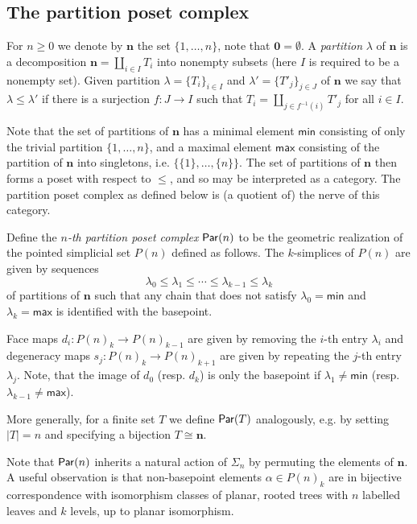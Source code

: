 \subsection{The partition poset complex}
For $n\geq 0$ we denote by $\mathbf{n}$ the set $\{1,\dots,n\}$, note that $\mathbf{0}=\emptyset$. A \textit{partition} $\lambda$ of $\mathbf{n}$ is a decomposition $\mathbf{n}=\coprod_{i\in I} T_i$ into nonempty subsets (here $I$ is required to be a nonempty set). Given partition $\lambda=\{T_i\}_{i\in I}$ and $\lambda'=\{T'_j\}_{j\in J}$ of $\mathbf{n}$ we say that $\lambda \leq \lambda'$ if there is a surjection $f\colon J\to I$ such that $T_i=\coprod_{j\in f^{-1}(i)} T'_j$ for all $i\in I$. 

Note that the set of partitions of $\mathbf{n}$ has a minimal element $\mathsf{min}$ consisting of only the trivial partition $\{1,\dots,n\}$, and a maximal element $\mathsf{max}$ consisting of the partition of $\mathbf{n}$ into singletons, i.e. $\{\{1\},\dots, \{n\}\}$. The set of partitions of $\mathbf{n}$ then forms a poset with respect to $\leq$, and so may be interpreted as a category. The partition poset complex as defined below is (a quotient of) the nerve of this category.

\begin{definition} \label{def:par-poset} Define the \textit{$n$-th partition poset complex} $\mathsf{Par}(n)$ to be the geometric realization of the pointed simplicial set $P(n)$ defined as follows. The $k$-simplices of $P(n)$ are given by sequences \[ \lambda_0 \leq \lambda_1 \leq \cdots \leq \lambda_{k-1} \leq \lambda_k \] of partitions of $\mathbf{n}$ such that any chain that does not satisfy $\lambda_0=\mathsf{min}$ and $\lambda_k=\mathsf{max}$ is identified with the basepoint. 

Face maps $d_i\colon P(n)_k\to P(n)_{k-1}$ are given by removing the $i$-th entry $\lambda_i$ and degeneracy maps $s_j\colon P(n)_k\to P(n)_{k+1}$ are given by repeating the $j$-th entry $\lambda_j$. Note, that the image of $d_0$ (resp. $d_k$) is only the basepoint if $\lambda_1\neq \mathsf{min}$ (resp. $\lambda_{k-1}\neq \mathsf{max}$).
\end{definition}

More generally, for a finite set $T$ we define $\mathsf{Par}(T)$ analogously, e.g. by setting $|T|=n$ and specifying a bijection $T\cong \mathbf{n}$. 

\begin{remark}
    Note that $\mathsf{Par}(n)$ inherits a natural action of $\Sigma_n$ by permuting the elements of $\mathbf{n}$. A useful observation is that non-basepoint elements $\alpha \in P(n)_k$ are in bijective correspondence with isomorphism classes of planar, rooted trees with $n$ labelled leaves and $k$ levels, up to planar isomorphism. 
\end{remark}

